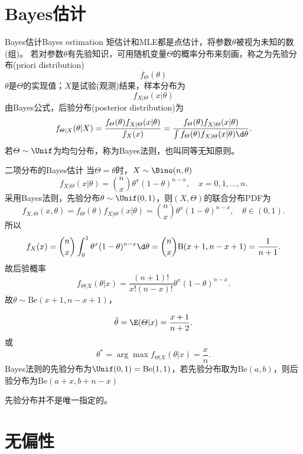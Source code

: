\section{Bayes估计}

\begin{definition}
	{Bayes估计}{Bayes estimation}
	矩估计和MLE都是点估计，将参数$\theta$被视为未知的数(组)。
	若对参数$\theta$有先验知识，可用随机变量$\varTheta$的概率分布来刻画，称之为先验分布(priori distribution)
	\[
		f_\varTheta(\theta)
	\]
	$\theta$是$\varTheta$的实现值；$X$是试验(观测)结果，样本分布为
	\[
		f_{X|\varTheta}(x|\theta)
	\]
	由Bayes公式，后验分布(posterior distribution)为
	\begin{equation}
		f_{\varTheta|X}(\theta|X)=\frac{f_\varTheta(\theta)f_{X|\varTheta}(x|\theta)}{f_X(x)}=\frac{f_\varTheta(\theta)f_{X|\varTheta}(x|\theta)}{\textstyle\int f_\varTheta(\theta)f_{X|\varTheta}(x|\theta)\d\theta}.
	\end{equation}
	若$\varTheta\sim\Unif$为均匀分布，称为Bayes法则，也叫同等无知原则。
\end{definition}

\begin{example}{二项分布的Bayes估计}{}
	当$\varTheta=\theta$时，$X\sim\Bino(n,\theta)$
	\[
		f_{X|\varTheta}(x|\theta)=\binom nx\theta^x(1-\theta)^{n-x},\quad x=0,1,\ldots,n.
	\]
	采用Bayes法则，先验分布$\theta\sim\Unif(0,1)$，则$(X,\varTheta)$的联合分布PDF为
	\[
		f_{X,\varTheta}(x,\theta)=f_{\varTheta}(\theta)f_{X|\varTheta}(x|\theta)=\binom nx\theta^x(1-\theta)^{n-x},\quad\theta\in(0,1).
	\]
	所以
	\[
		f_X(x)=\binom nx\int_0^1\theta^x(1-\theta)^{n-x}\d\theta=\binom nx\mathrm B(x+1,n-x+1)=\frac1{n+1}.
	\]
	故后验概率
	\[
		f_{\varTheta|X}(\theta|x)=\frac{(n+1)!}{x!(n-x)!}\theta^x(1-\theta)^{n-x}.
	\]
	故$\theta\sim\mathrm{Be}(x+1,n-x+1)$，
	
	\[
		\hat\theta=\E(\varTheta|x)=\frac{x+1}{n+2}.
	\]
	或
	\[
		\theta^\ast=\arg\max f_{\varTheta|X}(\theta|x)=\frac xn.
	\]
	\tcblower
	Bayes法则的先验分布为$\Unif(0,1)=\mathrm{Be}(1,1)$，若先验分布取为$\mathrm{Be}(a,b)$，则后验分布为$\mathrm{Be}(a+x,b+n-x)$
\end{example}

\begin{remark}
	先验分布并不是唯一指定的。
\end{remark}

\section{无偏性}

